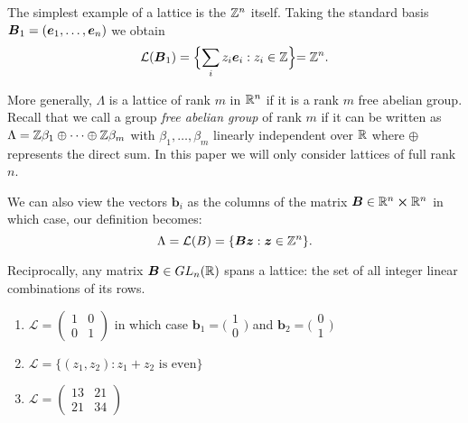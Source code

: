 \begin{example}
    The simplest example of a lattice is the $\mathbb{Z}^n$ itself. Taking the standard basis $\boldsymbol{B}_1 = (\boldsymbol{e}_1, \dots, \boldsymbol{e}_n)$ we obtain
$$\mathcal{L}(\boldsymbol{B}_1) = \Bigl\{ \sum_i z_i \boldsymbol{e}_i : z_i \in \mathbb{Z} \Bigl\} = \mathbb{Z}^n.$$
\end{example}
More generally, $\Lambda$ is a lattice of rank $m$ in $\mathbb{R}^n$ if it is a rank $m$ free abelian group. Recall that we call a group \textit{free abelian group} of rank $m$ if it can be written as $\Lambda = \mathbb{Z}\beta_1 \oplus \cdots \oplus\mathbb{Z}\beta_m$ with $\beta_1, \dots, \beta_m$ linearly independent over $\mathbb{R}$ where $\oplus$ represents the direct sum. In this paper we will only consider lattices of full rank $n$. 

\begin{remark}
    We can also view the vectors $\bm{b}_i$ as the columns of the matrix $\boldsymbol{B} \in \mathbb{R}^n \cross \mathbb{R}^n$ in which case, our definition becomes:
    $$\Lambda = \mathcal{L}(B) = \{\boldsymbol{Bz} :  \boldsymbol{z} \in \mathbb{Z}^n \}.$$
\end{remark}

Reciprocally, any matrix $\boldsymbol{B} \in GL_n(\mathbb{R})$ spans a lattice: the set of all integer linear combinations of its rows.

\begin{example}
\begin{enumerate}
    \item $\mathcal{L} = \begin{pmatrix}
        1 & 0\\
        0 & 1
	\end{pmatrix}$ in which case $\bm{b}_1 = \big(\begin{smallmatrix}
          1\\
          0
	\end{smallmatrix}\big)$ and $\bm{b}_2 = \big(\begin{smallmatrix}
          0\\
          1
        \end{smallmatrix}\big)$
    \item $\mathcal{L} = \{(z_1,z_2) : z_1 + z_2 \text{ is even}\}$
    \item $\mathcal{L} = \begin{pmatrix}
        13 & 21\\
        21 & 34
        \end{pmatrix}$
\end{enumerate}
\end{example}

